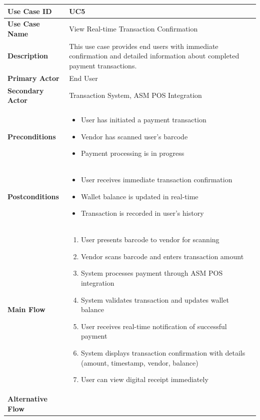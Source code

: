 \begin{longtable}{|p{3cm}|p{11cm}|}
\hline
\textbf{Use Case ID} & UC5 \\
\hline
\textbf{Use Case Name} & View Real-time Transaction Confirmation \\
\hline
\textbf{Description} & This use case provides end users with immediate confirmation and detailed information about completed payment transactions. \\
\hline
\textbf{Primary Actor} & End User \\
\hline
\textbf{Secondary Actor} & Transaction System, ASM POS Integration \\
\hline
\textbf{Preconditions} & 
\begin{itemize}[nosep,leftmargin=*]
\item User has initiated a payment transaction
\item Vendor has scanned user's barcode
\item Payment processing is in progress
\end{itemize} \\
\hline
\textbf{Postconditions} & 
\begin{itemize}[nosep,leftmargin=*]
\item User receives immediate transaction confirmation
\item Wallet balance is updated in real-time
\item Transaction is recorded in user's history
\end{itemize} \\
\hline
\textbf{Main Flow} & 
\begin{enumerate}[nosep,leftmargin=*]
\item User presents barcode to vendor for scanning
\item Vendor scans barcode and enters transaction amount
\item System processes payment through ASM POS integration
\item System validates transaction and updates wallet balance
\item User receives real-time notification of successful payment
\item System displays transaction confirmation with details (amount, timestamp, vendor, balance)
\item User can view digital receipt immediately
\end{enumerate} \\
\hline
\textbf{Alternative Flow} & 
\begin{itemize}[nosep,leftmargin=*]

\end{itemize}
\end{longtable}
